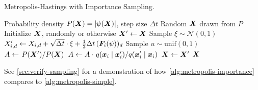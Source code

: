 \documentclass[Thesis.tex]{subfiles}
\begin{document}
\begin{algorithm}[h]
    \caption{Metropolis-Hastings with Importance Sampling.}
    \label{alg:metropolis-importance}
    \begin{algorithmic}[1]
        \Require Probability density $P(\bm{X}) = \abs{\psi(\bm{X})}$, step size $\Delta t$
        \Ensure Random $\bm{X}$ drawn from $P$
        \State Initialize $\bm{X}$, randomly or otherwise
        \Repeat
            \State $\bm{X}'\gets \bm{X}$
              \State Sample $\xi\sim \mathcal{N}(0, 1)$
              \State $X_{i,d}'\gets X_{i,d} + \sqrt{\Delta t} \cdot \xi +
              \frac{1}{2}\Delta t\,(\bm{F}_i(\psi))_d$
            \EndFor
            \State Sample $u\sim\text{unif}(0, 1)$
            \State $A\gets \flatfrac{P\qty(\vX')}{P\qty(\vX)}$
            \State $A\gets A\cdot \flatfrac{q\qty(\vx_i\;\middle|\;\vx_i')}{q\qty(\vx_i'\;\middle|\;\vx_i)}$
              \State $\bm{X} \gets \bm{X}'$
            \EndIf
            \State \Yield $\bm{X}$
          \EndFor
    \end{algorithmic}
\end{algorithm}
See \cref{sec:verify-sampling} for a demonstration of how
\cref{alg:metropolis-importance} compares to \cref{alg:metropolis-simple}.
\end{document}
